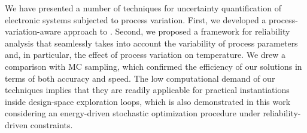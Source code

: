 We have presented a number of techniques for uncertainty quantification of electronic systems subjected to process variation.
First, we developed a process-variation-aware approach to \dssta.
Second, we proposed a framework for reliability analysis that seamlessly takes into account the variability of process parameters and, in particular, the effect of process variation on temperature.
We drew a comparison with MC sampling, which confirmed the efficiency of our solutions in terms of both accuracy and speed.
The low computational demand of our techniques implies that they are readily applicable for practical instantiations inside design-space exploration loops, which is also demonstrated in this work considering an energy-driven stochastic optimization procedure under reliability-driven constraints.
